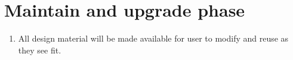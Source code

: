 \documentclass[12pt,a4paper]{article}
\begin{document}
\section{Maintain and upgrade phase}
\begin{enumerate}
\item All design material will be made available for user to modify and reuse as they see fit.
\end{enumerate}
\end{document}
